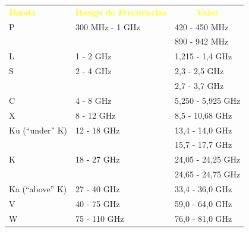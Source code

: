 \begin{landscape}
\begin{minipage}[c]{0.50\textheight}
  \end{minipage}
  \begin{minipage}[c]{0.50\textheight}

  \centering

  \label{tab:06.bandas.radar}

  \begin{adjustbox}{width = 0.9\linewidth}

    \begin{tabular}{lll} \rowcolor{blue!50!black} \centering
      \textcolor{yellow}{\bf Banda} & \textcolor{yellow}{ {\bf Rango
          de Frecuencias}}
      & \multicolumn{1}{c}{ \textcolor{yellow}{\bf Valor}} \\
      P & 300 MHz - 1 GHz & 420 - 450 MHz \\
      & & 890 - 942 MHz \\ \hline L & 1 - 2 GHz & 1,215 - 1,4 GHz \\
      \hline
      S  & 2 - 4 GHz & 2,3  - 2,5 GHz \\
      & & 2,7 - 3,7 GHz \\ \hline C & 4 - 8 GHz & 5,250 - 5,925 GHz \\
      \hline X & 8 - 12 GHz & 8,5 - 10,68 GHz \\ \hline
      Ku (``under'' K) & 12 - 18 GHz & 13,4 - 14,0 GHz \\
      & & 15,7 - 17,7 GHz \\ \hline
      K & 18 - 27 GHz & 24,05 - 24,25 GHz \\
      & & 24,65 - 24,75 GHz \\ \hline Ka (``above'' K) & 27 - 40 GHz &
      33,4 - 36,0 GHz \\ \hline V & 40 - 75 GHz & 59,0 - 64,0 GHz \\
      \hline W & 75 - 110 GHz & 76,0 - 81,0 GHz \\ \hline 
    \end{tabular}

  \end{adjustbox}

  \end{minipage}



\end{landscape}






